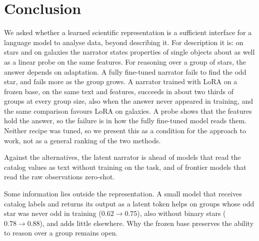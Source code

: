 \section{Conclusion}
We asked whether a learned scientific representation is a sufficient interface for a language
model to analyse data, beyond describing it. For description it is: on stars and on galaxies the
narrator states properties of single objects about as well as a linear probe on the same
features. For reasoning over a group of stars, the answer depends on adaptation. A fully
fine-tuned narrator fails to find the odd star, and fails more as the group grows. A narrator
trained with LoRA on a frozen base, on the same text and features, succeeds in about two thirds
of groups at every group size, also when the answer never appeared in training, and the same
comparison favours LoRA on galaxies. A probe shows that the features hold the answer, so the
failure is in how the fully fine-tuned model reads them. Neither recipe was tuned, so we present
this as a condition for the approach to work, not as a general ranking of the two methods.

Against the alternatives, the latent narrator is ahead of models that read the catalog values
as text without training on the task, and of frontier models that read the raw observations
zero-shot.

Some information lies outside the representation. A small model that receives catalog labels
and returns its output as a latent token helps on groups whose odd star was never odd in
training ($0.62 \to 0.75$), also without binary stars ($0.78 \to 0.88$), and adds little
elsewhere. Why the
frozen base preserves the ability to reason over a group remains open.
